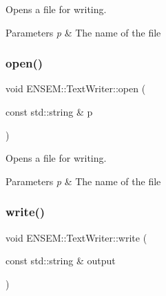 Opens a file for writing. 
\begin{DoxyParams}{Parameters}
{\em p} & The name of the file \\
\hline
\end{DoxyParams}
\mbox{\label{classENSEM_1_1TextWriter_a8a7bdd80e930dd002d3af693e5a2cb95}} 
\subsubsection{\texorpdfstring{open()}{open()}\hspace{0.1cm}{\footnotesize\ttfamily [2/2]}}
{\footnotesize\ttfamily void E\+N\+S\+E\+M\+::\+Text\+Writer\+::open (\begin{DoxyParamCaption}\item[{const std\+::string \&}]{p }\end{DoxyParamCaption})}

Opens a file for writing. 
\begin{DoxyParams}{Parameters}
{\em p} & The name of the file \\
\hline
\end{DoxyParams}
\mbox{\label{classENSEM_1_1TextWriter_a46f85ca8047ad9b0419c1f8e40847b52}} 
\subsubsection{\texorpdfstring{write()}{write()}\hspace{0.1cm}{\footnotesize\ttfamily [1/24]}}
{\footnotesize\ttfamily void E\+N\+S\+E\+M\+::\+Text\+Writer\+::write (\begin{DoxyParamCaption}\item[{const std\+::string \&}]{output }\end{DoxyParamCaption})}

